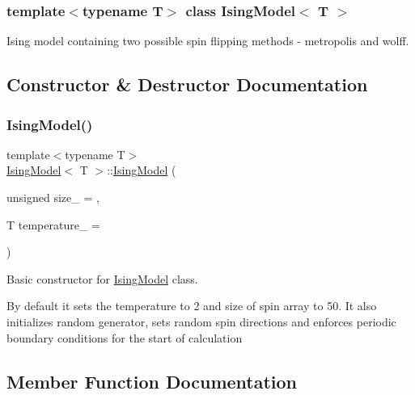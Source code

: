 \subsubsection*{template$<$typename T$>$\newline
class Ising\+Model$<$ T $>$}

Ising model containing two possible spin flipping methods -\/ metropolis and wolff. 

\subsection{Constructor \& Destructor Documentation}
\mbox{\label{classIsingModel_a3c9a903d3ddada5ce514ba66f99b0282}} 
\subsubsection{\texorpdfstring{Ising\+Model()}{IsingModel()}}
{\footnotesize\ttfamily template$<$typename T$>$ \\
\mbox{\hyperlink{classIsingModel}{Ising\+Model}}$<$ T $>$\+::\mbox{\hyperlink{classIsingModel}{Ising\+Model}} (\begin{DoxyParamCaption}\item[{unsigned}]{size\+\_\+ = {},  }\item[{T}]{temperature\+\_\+ = {} }\end{DoxyParamCaption})\hspace{0.3cm}{\ttfamily [inline]}}



Basic constructor for \mbox{\hyperlink{classIsingModel}{Ising\+Model}} class. 

By default it sets the temperature to 2 and size of spin array to 50. It also initializes random generator, sets random spin directions and enforces periodic boundary conditions for the start of calculation 

\subsection{Member Function Documentation}
\mbox{\label{classIsingModel_a0a387ccae720604f4de13d5b0762ac62}} 
